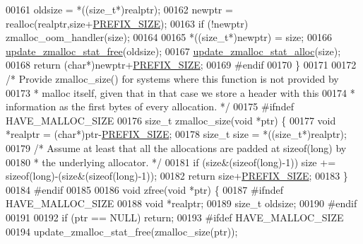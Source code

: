 \begin{DoxyCode}
{00161     oldsize = *((size\_t*)realptr);
00162     newptr = realloc(realptr,size+\hyperlink{zmalloc_8c_abe208177340b58cb5096daabe07922d1}{PREFIX\_SIZE});
00163     \textcolor{keywordflow}{if} (!newptr) zmalloc\_oom\_handler(size);
00164 
00165     *((size\_t*)newptr) = size;
00166     \hyperlink{zmalloc_8c_a9be7d44298f111e7d7f69abb0b41f391}{update\_zmalloc\_stat\_free}(oldsize);
00167     \hyperlink{zmalloc_8c_adc62adb8ec66924b8eaf16c123e1eb9c}{update\_zmalloc\_stat\_alloc}(size);
00168     \textcolor{keywordflow}{return} (\textcolor{keywordtype}{char}*)newptr+\hyperlink{zmalloc_8c_abe208177340b58cb5096daabe07922d1}{PREFIX\_SIZE};
00169 \textcolor{preprocessor}{#}\textcolor{preprocessor}{endif}
00170 \}
00171 
00172 \textcolor{comment}{/* Provide zmalloc\_size() for systems where this function is not provided by}
00173 \textcolor{comment}{ * malloc itself, given that in that case we store a header with this}
00174 \textcolor{comment}{ * information as the first bytes of every allocation. */}
00175 \textcolor{preprocessor}{#}\textcolor{preprocessor}{ifndef} \textcolor{preprocessor}{HAVE\_MALLOC\_SIZE}
00176 size\_t zmalloc\_size(\textcolor{keywordtype}{void} *ptr) \{
00177     \textcolor{keywordtype}{void} *realptr = (\textcolor{keywordtype}{char}*)ptr-\hyperlink{zmalloc_8c_abe208177340b58cb5096daabe07922d1}{PREFIX\_SIZE};
00178     size\_t size = *((size\_t*)realptr);
00179     \textcolor{comment}{/* Assume at least that all the allocations are padded at sizeof(long) by}
00180 \textcolor{comment}{     * the underlying allocator. */}
00181     \textcolor{keywordflow}{if} (size&(\textcolor{keyword}{sizeof}(\textcolor{keywordtype}{long})-1)) size += \textcolor{keyword}{sizeof}(\textcolor{keywordtype}{long})-(size&(\textcolor{keyword}{sizeof}(\textcolor{keywordtype}{long})-1));
00182     \textcolor{keywordflow}{return} size+\hyperlink{zmalloc_8c_abe208177340b58cb5096daabe07922d1}{PREFIX\_SIZE};
00183 \}
00184 \textcolor{preprocessor}{#}\textcolor{preprocessor}{endif}
00185 
00186 \textcolor{keywordtype}{void} zfree(\textcolor{keywordtype}{void} *ptr) \{
00187 \textcolor{preprocessor}{#}\textcolor{preprocessor}{ifndef} \textcolor{preprocessor}{HAVE\_MALLOC\_SIZE}
00188     \textcolor{keywordtype}{void} *realptr;
00189     size\_t oldsize;
00190 \textcolor{preprocessor}{#}\textcolor{preprocessor}{endif}
00191 
00192     \textcolor{keywordflow}{if} (ptr == NULL) \textcolor{keywordflow}{return};
00193 \textcolor{preprocessor}{#}\textcolor{preprocessor}{ifdef} \textcolor{preprocessor}{HAVE\_MALLOC\_SIZE}
00194     update\_zmalloc\_stat\_free(zmalloc\_size(ptr));
}
\end{DoxyCode}
